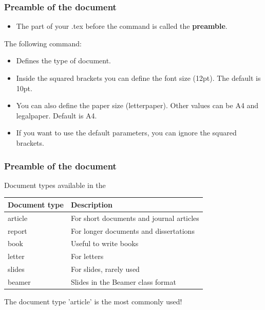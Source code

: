 \begin{frame}[fragile]
\frametitle{Preamble of the document}
\begin{itemize}
\item The part of your .tex before the \verb|| command is called the \textbf{preamble}.
\end{itemize}
The following command: 
\begin{framed}
\begin{minipage}[b]{.4\textwidth}
\end{minipage}%
\end{framed}

\begin{itemize}
\item Defines the type of document.\\
\item Inside the squared brackets you can define the font size (12pt). The default is 10pt. \\
\item You can also define the paper size (letterpaper). Other values can be A4 and legalpaper. Default is A4. \\
\item If you want to use the default parameters, you can ignore the squared brackets.
\end{itemize}
\end{frame}

\begin{frame}[fragile]
\frametitle{Preamble of the document}
Document types available in the \color{blue}{\verb|\documentclass|} \color{black}{command:} \\
\vspace{1cm}
\begin{tabular}{ll}
\textbf{Document type} & \textbf{Description} \\ \hline
article & For short documents and journal articles \\ 
report & For longer documents and dissertations \\ 
book & Useful to write books \\
letter & For letters \\ 
slides & For slides, rarely used \\ 
beamer & Slides in the Beamer class format \\ \hline
\end{tabular}

The document type 'article' is the most commonly used!
\end{frame}


